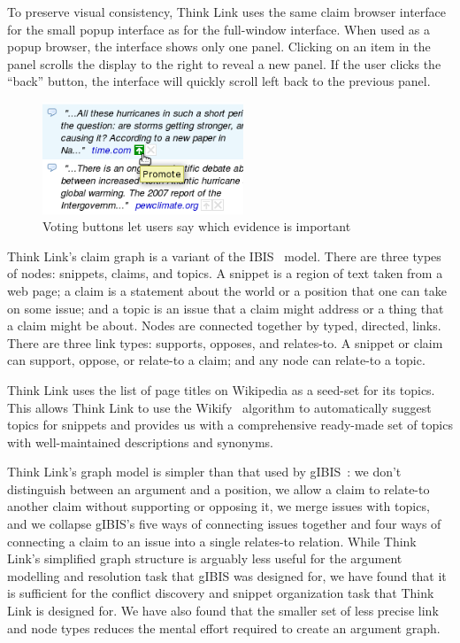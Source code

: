 \documentclass{chi2009}
\newcommand{\todo}[1]{}
\begin{document}
To preserve visual consistency, Think Link uses the same claim browser interface for the small popup interface as for the full-window interface. When used as a popup browser, the interface shows only one panel. Clicking on an item in the panel scrolls the display to the right to reveal a new panel. If the user clicks the ``back'' button, the interface will quickly scroll left back to the previous panel.

\begin{figure}[tb]
	\begin{center}
	\includegraphics[width=6cm]{../screenshots/v2_vote.png}
	\caption{Voting buttons let users say which evidence is important}
	\label{voting}
	\end{center}
\end{figure}


Think Link's claim graph is a variant of the IBIS~\cite{Rittel1973} model. There are three types of nodes: snippets, claims, and topics. 
A snippet is a region of text taken from a web page; a claim is a statement about the world or a position that one can take on some issue; and a topic is an issue that a claim might address or a thing that a claim might be about. Nodes are connected together by typed, directed, links. 
There are three link types: supports, opposes, and relates-to. A snippet or claim can support, oppose, or relate-to a claim; and any node can relate-to a topic. 

Think Link uses the list of page titles on Wikipedia as a seed-set for its topics. This allows Think Link to use the Wikify~\cite{Mihalcea2007} algorithm to automatically suggest topics for snippets and provides us with a comprehensive ready-made set of topics with well-maintained descriptions and synonyms.

Think Link's graph model is simpler than that used by gIBIS~\cite{Conklin1987a}: we don't distinguish between an argument and a position, we allow a claim to relate-to another claim without supporting or opposing it, we merge issues with topics, and we collapse gIBIS's five ways of connecting issues together and four ways of connecting a claim to an issue into a single relates-to relation. 
While Think Link's simplified graph structure is arguably less useful for the argument modelling and resolution task that gIBIS was designed for, we have found that it is sufficient for the conflict discovery and snippet organization task that Think Link is designed for. 
We have also found that the smaller set of less precise link and node types reduces the mental effort required to create an argument graph.
\end{document}
